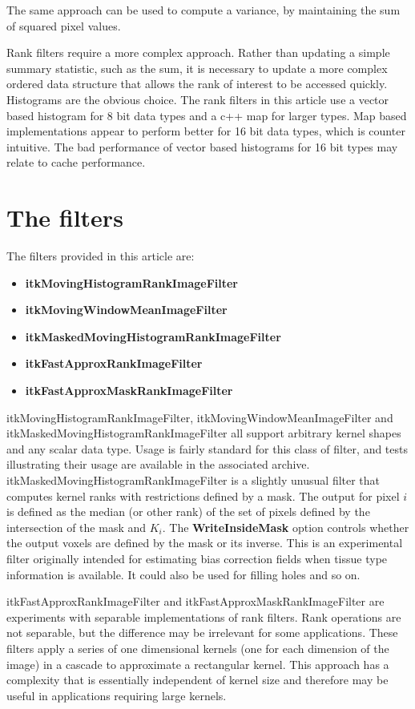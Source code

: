 \documentclass{InsightArticle}
\begin{document}
The same approach can be used to compute a variance, by maintaining
the sum of squared pixel values.

Rank filters require a more complex approach. Rather than updating a
simple summary statistic, such as the sum, it is necessary to update a
more complex ordered data structure that allows the rank of interest
to be accessed quickly. Histograms are the obvious choice. The rank
filters in this article use a vector based histogram for 8 bit data
types and a c++ map for larger types. Map based implementations appear
to perform better for 16 bit data types, which is counter
intuitive. The bad performance of vector based histograms for 16 bit
types may relate to cache performance.

\section{The filters}
The filters provided in this article are:
\begin{itemize}
\item {\bf itkMovingHistogramRankImageFilter}
\item {\bf itkMovingWindowMeanImageFilter}
\item {\bf itkMaskedMovingHistogramRankImageFilter}
\item {\bf itkFastApproxRankImageFilter}
\item {\bf itkFastApproxMaskRankImageFilter}
\end{itemize}

itkMovingHistogramRankImageFilter, itkMovingWindowMeanImageFilter and
itkMaskedMovingHistogramRankImageFilter all support arbitrary kernel
shapes and any scalar data type. Usage is fairly standard for this
class of filter, and tests illustrating their usage are available in
the associated archive. itkMaskedMovingHistogramRankImageFilter is a
slightly unusual filter that computes kernel ranks with restrictions
defined by a mask. The output for pixel $i$ is defined as the median
(or other rank) of the set of pixels defined by the intersection of
the mask and $K_i$. The {\bf WriteInsideMask} option controls whether
the output voxels are defined by the mask or its inverse. This is an
experimental filter originally intended for estimating bias correction
fields when tissue type information is available. It could also be
used for filling holes and so on.

itkFastApproxRankImageFilter and itkFastApproxMaskRankImageFilter are
experiments with separable implementations of rank filters. Rank
operations are not separable, but the difference may be irrelevant for
some applications. These filters apply a series of one dimensional
kernels (one for each dimension of the image) in a cascade to
approximate a rectangular kernel. This approach has a complexity that
is essentially independent of kernel size and therefore may be useful
in applications requiring large kernels.
\end{document}
